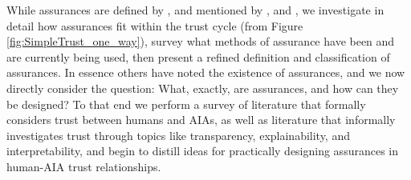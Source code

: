     While assurances are defined by \citeauthor{Lillard2016-yg}, and mentioned by \citeauthor{McKnight2001-fa}, and \citeauthor{Corritore2003-gx}, we investigate in detail how assurances fit within the trust cycle (from Figure \ref{fig:SimpleTrust_one_way}), survey what methods of assurance have been and are currently being used, then present a refined definition and classification of assurances. In essence others have noted the existence of assurances, and we now directly consider the question: What, exactly, are assurances, and how can they be designed? To that end we perform a survey of literature that formally considers trust between humans and AIAs, as well as literature that informally investigates trust through topics like transparency, explainability, and interpretability, and begin to distill ideas for practically designing assurances in human-AIA trust relationships.





